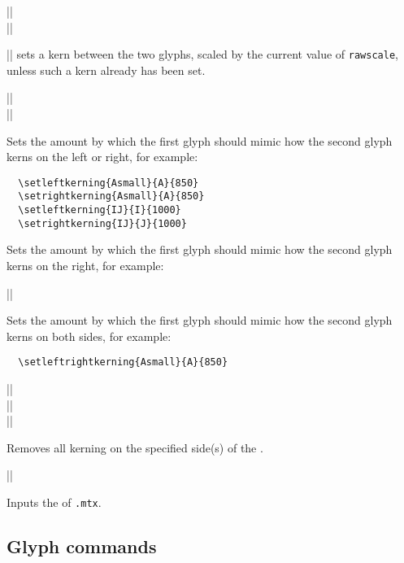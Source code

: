 \documentclass[a4paper]{ltxguide}
\newcommand*{\meta}{\m}
\begin{document}
\begin{decl}
  |\setkern|\\
  |\resetkern|
\end{decl}
|\setkern| sets a kern between the two glyphs, scaled by the current 
value of \texttt{rawscale}, unless such a kern already has been set.


\begin{decl}
  |\setleftkerning|\\
  |\setrightkerning|
\end{decl}
Sets the amount by which the first glyph should mimic how the second
glyph kerns on the left or right, for example:
\begin{verbatim}
  \setleftkerning{Asmall}{A}{850}
  \setrightkerning{Asmall}{A}{850}
  \setleftkerning{IJ}{I}{1000}
  \setrightkerning{IJ}{J}{1000}
\end{verbatim}
Sets the amount by which the first glyph should mimic how the second
glyph kerns on the right, for example:

\begin{decl}
  |\setleftrightkerning|
\end{decl}
Sets the amount by which the first glyph should mimic how the second
glyph kerns on both sides, for example:
\begin{verbatim}
  \setleftrightkerning{Asmall}{A}{850}
\end{verbatim}

\begin{decl}
  |\noleftkerning|\\
  |\norightkerning|\\
  |\noleftrightkerning|
\end{decl}
Removes all kerning on the specified side(s) of the \meta{glyph}.

\begin{decl}
  ||
\end{decl}
Inputs the  of \texttt{.mtx}.



\subsection{Glyph commands}
\end{document}

